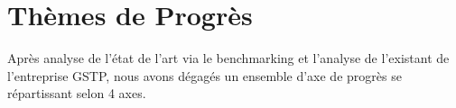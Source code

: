 \section{Thèmes de Progrès}

Après analyse de l'état de l'art via le benchmarking et l'analyse de l'existant
de l'entreprise GSTP, nous avons dégagés un ensemble d'axe de progrès se 
répartissant selon 4 axes.
